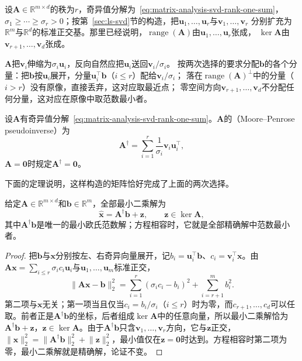 设$\bm A\in\mathbb R^{m\times d}$的秩为$r$，奇异值分解为~\eqref{eq:matrix-analysis-svd-rank-one-sum}，
$\sigma_1\geq\cdots\geq\sigma_r>0$；按第~\ref{sec:ls-svd}节的构造，把$\bm u_1,\ldots,\bm u_r$与$\bm v_1,\ldots,\bm v_r$
分别扩充为$\mathbb R^m$与$\mathbb R^d$的标准正交基。那里已经说明，$\operatorname{range}(\bm A)$由$\bm u_1,\ldots,\bm u_r$张成，
$\ker\bm A$由$\bm v_{r+1},\ldots,\bm v_d$张成。

$\bm A$把$\bm v_i$伸缩为$\sigma_i\bm u_i$，反向自然应把$\bm u_i$送回$\bm v_i/\sigma_i$。
按两次选择的要求分配$\bm b$的各个分量：把$\bm b$按$\bm u_i$展开，分量$\bm u_i^\top\bm b$（$i\leq r$）配给$\bm v_i/\sigma_i$；
落在$\operatorname{range}(\bm A)^\perp$中的分量（$i>r$）没有原像，直接丢弃，这对应取最近点；
零空间方向$\bm v_{r+1},\ldots,\bm v_d$不分配任何分量，这对应在原像中取范数最小者。

\begin{definition}
\label{def:matrix-analysis-pseudoinverse}
设$\bm A$有奇异值分解~\eqref{eq:matrix-analysis-svd-rank-one-sum}。$\bm A$的（Moore--Penrose pseudoinverse）为
\begin{equation}
 \bm A^\dagger=\sum_{i=1}^r\frac{1}{\sigma_i}\bm v_i\bm u_i^\top,
 \label{eq:matrix-analysis-pseudoinverse}
\end{equation}
$\bm A=\bm0$时规定$\bm A^\dagger=\bm0$。
\end{definition}

下面的定理说明，这样构造的矩阵恰好完成了上面的两次选择。
\begin{theorem}[最小二乘与最小范数]
\label{thm:matrix-analysis-pseudoinverse-minimum-norm}
给定$\bm A\in\mathbb R^{m\times d}$和$\bm b\in\mathbb R^m$，全部最小二乘解为
\begin{equation}
 \hat{\bm x}=\bm A^\dagger\bm b+\bm z,
 \qquad \bm z\in\ker\bm A,
 \label{eq:ls-all-pseudoinverse-solutions}
\end{equation}
其中$\bm A^\dagger\bm b$是唯一的最小欧氏范数解；方程相容时，它就是全部精确解中范数最小者。
\end{theorem}
\begin{proof}
把$\bm b$与$\bm x$分别按左、右奇异向量展开，记$b_i=\bm u_i^\top\bm b$、$c_i=\bm v_i^\top\bm x$。由$\bm A\bm x=\sum_{i\leq r}\sigma_ic_i\bm u_i$与$\bm u_1,\ldots,\bm u_m$标准正交，
\[
 \lVert\bm A\bm x-\bm b\rVert_2^2
 =\sum_{i=1}^r(\sigma_ic_i-b_i)^2+\sum_{i=r+1}^m b_i^2 .
\]
第二项与$\bm x$无关；第一项当且仅当$c_i=b_i/\sigma_i$（$i\leq r$）时为零，而$c_{r+1},\ldots,c_d$可以任取。前者正是$\bm A^\dagger\bm b$的坐标，后者组成$\ker\bm A$中的任意向量，所以最小二乘解恰为$\bm A^\dagger\bm b+\bm z$，$\bm z\in\ker\bm A$。由于$\bm A^\dagger\bm b$只含$\bm v_1,\ldots,\bm v_r$方向，它与$\bm z$正交，$\lVert\bm x\rVert_2^2=\lVert\bm A^\dagger\bm b\rVert_2^2+\lVert\bm z\rVert_2^2$，最小值仅在$\bm z=\bm0$时达到。方程相容时第二项为零，最小二乘解就是精确解，论证不变。
\end{proof}

